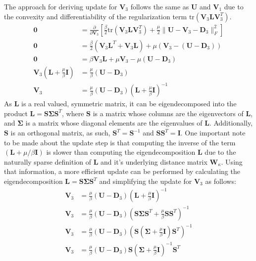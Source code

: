 The approach for deriving update for $\mathbf{V}_3$ follows the same as $\mathbf{U}$ and $\mathbf{V}_1$ due to the convexity and differentiability of the regularization term $\text{tr}(\mathbf{V}_3\mathbf{L}\mathbf{V}_3^T)$. 
\begin{equation*}
  \begin{aligned}
    \mathbf{0} &= \frac{\partial}{\partial \mathbf{V}_3}\left[ \frac{\beta}{2} \text{tr}(\mathbf{V}_3\mathbf{L}\mathbf{V}_3^T) + \frac{\mu}{2} \|\mathbf{U} - \mathbf{V}_3 - \mathbf{D}_3\|_F^2  \right]
    \\
    \mathbf{0} &= \frac{\beta}{2} (\mathbf{V}_3\mathbf{L}^T + \mathbf{V}_3 \mathbf{L}) + \mu (\mathbf{V}_3 - (\mathbf{U} - \mathbf{D}_3))
    \\
    \mathbf{0} &= \beta \mathbf{V}_3 \mathbf{L} + \mu \mathbf{V}_3 - \mu (\mathbf{U} - \mathbf{D}_3)
    \\
    \mathbf{V}_3 \left(\mathbf{L} + \frac{\mu}{\beta} \mathbf{I}\right) &= \frac{\mu}{\beta}(\mathbf{U} - \mathbf{D}_3)
    \\
    \mathbf{V}_3 &= \frac{\mu}{\beta}(\mathbf{U} - \mathbf{D}_3) \left(\mathbf{L} + \frac{\mu}{\beta} \mathbf{I}\right)^{-1} 
  \end{aligned}
\end{equation*}
As $\mathbf{L}$ is a real valued, symmetric matrix, it can be eigendecomposed into the product $\mathbf{L} = \mathbf{S \Sigma S}^T$, where $\mathbf{S}$ is a matrix whose columns are the eigenvectors of $\mathbf{L}$, and $\mathbf{\Sigma}$ is a matrix whose diagonal elements are the eigenvalues of $\mathbf{L}$. Additionally, $\mathbf{S}$ is an orthogonal matrix, as such, $\mathbf{S}^T = \mathbf{S}^{-1}$ and $\mathbf{SS}^T = \mathbf{I}$. One important note to be made about the update step is that computing the inverse of the term $(\mathbf{L} + \mu / \beta \mathbf{I})$ is slower than computing the eigendecomposition $\mathbf{L}$ due to the naturally sparse definition of $\mathbf{L}$ and it's underlying distance matrix $\mathbf{W}_{\kappa}$. Using that information, a more efficient update can be performed by calculating the eigendecomposition $\mathbf{L} = \mathbf{S \Sigma S}^T$ and simplifying the update for $\mathbf{V}_3$ as follows:
\begin{equation*}
  \begin{aligned}
    \mathbf{V}_3 &= \frac{\mu}{\beta}(\mathbf{U} - \mathbf{D}_3) \left(\mathbf{L} + \frac{\mu}{\beta} \mathbf{I}\right)^{-1}
    \\
    \mathbf{V}_3 &= \frac{\mu}{\beta}(\mathbf{U} - \mathbf{D}_3) \left(\mathbf{S \Sigma S}^T + \frac{\mu}{\beta} \mathbf{SS}^T\right)^{-1}
    \\ 
    \mathbf{V}_3 &= \frac{\mu}{\beta}(\mathbf{U} - \mathbf{D}_3) 
    \left(\mathbf{S}\left(\mathbf{\Sigma} + \frac{\mu}{\beta} \mathbf{I}\right)  \mathbf{S}^T\right)^{-1}
    \\
    \mathbf{V}_3 &= \frac{\mu}{\beta}(\mathbf{U} - \mathbf{D}_3) \mathbf{S} \left(\mathbf{\Sigma} + \frac{\mu}{\beta} \mathbf{I}\right)^{-1} \mathbf{S}^T 
  \end{aligned}
\end{equation*}
